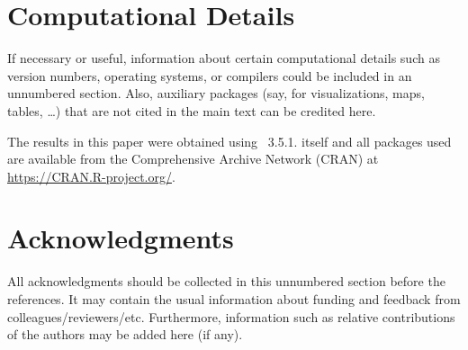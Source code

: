 \documentclass[article]{jdssv}
\begin{document}

%


\newpage
\section*{Computational Details}

If necessary or useful, information about certain computational details
such as version numbers, operating systems, or compilers could be included
in an unnumbered section. Also, auxiliary packages (say, for visualizations,
maps, tables, \dots) that are not cited in the main text can be credited here.


The results in this paper were obtained using
~3.5.1.  itself
and all packages used are available from the Comprehensive
 Archive Network (CRAN) at
\url{https://CRAN.R-project.org/}.


\section*{Acknowledgments}

All acknowledgments should be collected in this
unnumbered section before the references. It may contain the usual information
about funding and feedback from colleagues/reviewers/etc. Furthermore,
information such as relative contributions of the authors may be added here
(if any).






\end{document}
